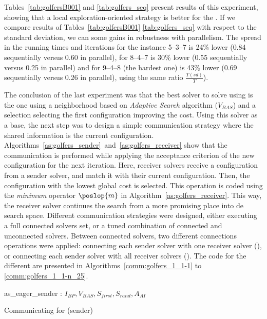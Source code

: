 Tables~\ref{tab:golfersB001} and \ref{tab:golfers_seq} present results of this experiment, showing that a local exploration-oriented strategy is better for the \SGP. If we compare results of Tables~\ref{tab:golfersB001} \ref{tab:golfers_seq} with respect to the standard deviation, we can some gains in robustness with parallelism. The spread in the running times and iterations for the instance 5--3--7 is 24\% lower (0.84 sequentially versus 0.60 in parallel), for 8--4--7 is 30\% lower (0.55 sequentially versus 0.25 in parallel) and for 9--4--8 (the hardest one) is 43\% lower (0.69 sequentially versus 0.26 in parallel), using the same ratio $\tfrac{T(sd)}{T}$).

\separation

The conclusion of the last experiment was that the best solver to solve \SGP{} using \posl{} is the one using a neighborhood \om{} based on {\it Adaptive Search} algorithm ($V_{BAS}$) and a selection \om{} selecting the first configuration improving the cost. Using this solver as a base, the next step was to design a simple communication strategy where the shared information is the current configuration. Algorithms~\ref{as:golfers_sender}~and~\ref{as:golfers_receiver} show that the communication is performed while applying the acceptance criterion of the new configuration for the next iteration. Here, receiver solvers receive a configuration from a sender solver, and match it with their current configuration. Then, the configuration with the lowest global cost is selected. This operation is coded using the \textit{minimum} operator $\poslop{m}$ in Algorithm~\ref{as:golfers_receiver}. This way, the receiver solver continues the search from a more promising place into de search space. Different communication strategies were designed, either executing a full connected solvers set, or a tuned combination of connected and unconnected solvers. Between connected solvers, two different connections operations were applied: connecting each sender solver with one receiver solver (\oneTone), or connecting each sender solver with all receiver solvers (\oneTn). The code for the different \commstrs{} are presented in Algorithms~\ref{comm:golfers_1_1-1} to \ref{comm:golfers_1_1-n_25}.

\begin{algorithm}
\dontprintsemicolon
\SetNoline
{}
   as\_eager\_sender\;
\algoindent {} : $I_{BP}, V_{BAS}, S_{first}, S_{rand}, A_{AI}$ \;
\caption{Communicating \as{} for \SGP{} (sender)}\label{as:golfers_sender}
\end{algorithm}

